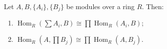 Let $A, B, \{A_i\}, \{B_j\}$ be modules over a ring $R$. Then:
\begin{enumerate}
\item[(i)] $\operatorname{Hom}_R(\sum A_i, B) \cong \prod \operatorname{Hom}_R(A_i, B)$;
\item[(ii)] $\operatorname{Hom}_R(A, \prod B_j) \cong \prod \operatorname{Hom}_R(A, B_j)$.
\end{enumerate}
